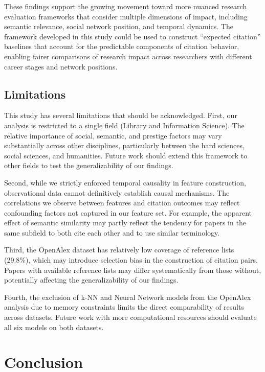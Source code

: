 \documentclass[12pt,a4paper]{article}
\begin{document}
These findings support the growing movement toward more nuanced research evaluation frameworks that consider multiple dimensions of impact, including semantic relevance, social network position, and temporal dynamics. The framework developed in this study could be used to construct ``expected citation'' baselines that account for the predictable components of citation behavior, enabling fairer comparisons of research impact across researchers with different career stages and network positions.

\subsection{Limitations}

This study has several limitations that should be acknowledged. First, our analysis is restricted to a single field (Library and Information Science). The relative importance of social, semantic, and prestige factors may vary substantially across other disciplines, particularly between the hard sciences, social sciences, and humanities. Future work should extend this framework to other fields to test the generalizability of our findings.

Second, while we strictly enforced temporal causality in feature construction, observational data cannot definitively establish causal mechanisms. The correlations we observe between features and citation outcomes may reflect confounding factors not captured in our feature set. For example, the apparent effect of semantic similarity may partly reflect the tendency for papers in the same subfield to both cite each other and to use similar terminology.

Third, the OpenAlex dataset has relatively low coverage of reference lists (29.8\%), which may introduce selection bias in the construction of citation pairs. Papers with available reference lists may differ systematically from those without, potentially affecting the generalizability of our findings.

Fourth, the exclusion of k-NN and Neural Network models from the OpenAlex analysis due to memory constraints limits the direct comparability of results across datasets. Future work with more computational resources should evaluate all six models on both datasets.

\section{Conclusion}
\label{sec:conclusion}
\end{document}
